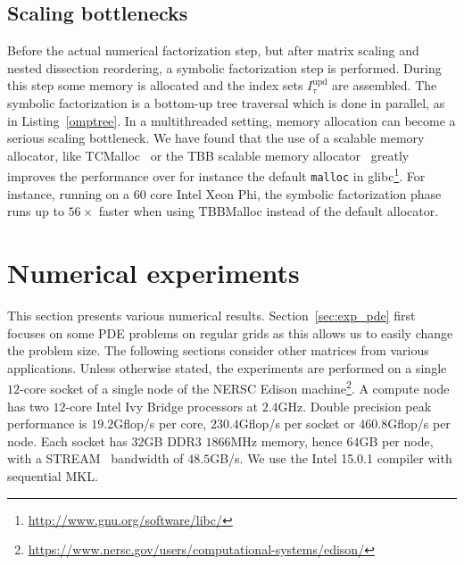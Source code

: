 \documentclass{article}
\newcommand{\tm}{\textsuperscript{\textregistered}}
\begin{document}
\subsection{Scaling bottlenecks}
Before the actual numerical factorization step, but after matrix
scaling and nested dissection reordering, a symbolic factorization
step is performed. During this step some memory is allocated and the
index sets $I^{\mathrm{upd}}_{\tau}$ are assembled.
The symbolic factorization is a bottom-up tree traversal which is done
in parallel, as in Listing~\ref{omptree}.
In a multithreaded setting, memory allocation can become a serious
scaling bottleneck. We have found that the use of a scalable memory
allocator, like TCMalloc~\cite{ghemawat2009tcmalloc} or the TBB
scalable memory allocator~\cite{reinders2007intel} greatly improves
the performance over for instance the default \verb+malloc+ in
glibc\footnote{\url{http://www.gnu.org/software/libc/}}. For instance,
running on a 60 core Intel\tm{} Xeon Phi, the symbolic factorization
phase runs up to $56 \times$ faster when using TBBMalloc instead of
the default allocator.




\section{Numerical experiments}\label{sec:experiments}
This section presents various numerical
results. Section~\ref{sec:exp_pde} first focuses on some PDE problems
on regular grids as this allows us to easily change the problem
size. The following sections consider other matrices from various
applications.  Unless otherwise stated, the experiments are performed
on a single $12$-core socket of a single node of the NERSC Edison
machine\footnote{\url{https://www.nersc.gov/users/computational-systems/edison/}}. A
compute node has two $12$-core Intel\tm{} Ivy Bridge processors at
$2.4$GHz. Double precision peak performance is $19.2$Gflop/s per core,
$230.4$Gflop/s per socket or $460.8$Gflop/s per node. Each socket has
$32$GB DDR3 $1866$MHz memory, hence $64$GB per node, with a
STREAM~\cite{streambench} bandwidth of $48.5$GB/s. We use the
Intel\tm{} 15.0.1 compiler with sequential MKL.
\end{document}
